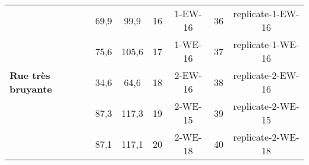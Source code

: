 \begin{table}[ht]
\begin{tabular}{|p{2cm}|c|c||c|c||c|c|}
\hline
\multirow{5}{2cm}{\textbf{Rue très bruyante}} & 69,9 & 99,9 & 16 & 1-EW-16 & 36 & replicate-1-EW-16 \\
                                  & 75,6 & 105,6 & 17 & 1-WE-16 & 37 & replicate-1-WE-16 \\
                                  & 34,6 & 64,6 & 18 & 2-EW-16 & 38 & replicate-2-EW-16 \\
                                  & 87,3 & 117,3 & 19 & 2-WE-15 & 39 & replicate-2-WE-15 \\
                                  & 87,1 & 117,1 & 20 & 2-WE-18 & 40 & replicate-2-WE-18\\
\bottomrule
\end{tabular}
\label{tab:resume_scene_test}
\end{table}